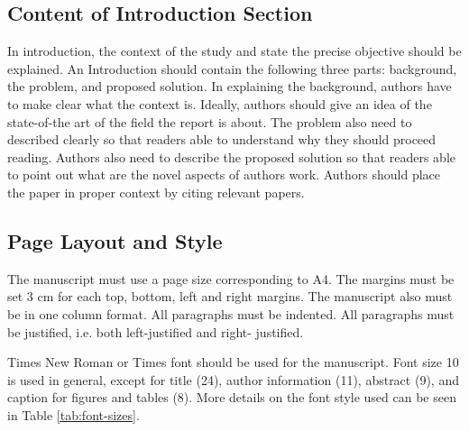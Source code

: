 \documentclass[]{indojc_single}
\begin{document}
\subsection{Content of Introduction Section}
In introduction, the context of the study and state the precise objective should be explained. An Introduction should contain the following three parts: background, the problem, and proposed solution. In explaining the background, authors have to make clear what the context is. Ideally, authors should give an idea of the state-of-the art of the field the report is about. The problem also need to described clearly so that readers able to understand why they should proceed reading. Authors also need to describe the proposed solution so that readers able to point out what are the novel aspects of authors work. Authors should place the paper in proper context by citing relevant papers. 

\subsection{Page Layout and Style}
The manuscript must use a page size corresponding to A4. The margins must be set 3 cm for each top, bottom, left and right margins. The manuscript also must be in one column format. All paragraphs must be indented. All paragraphs must be justified, i.e. both left-justified and right- justified.

Times New Roman or Times font should be used for the manuscript. Font size 10 is used in general, except for title (24), author information (11), abstract (9), and caption for figures and tables (8). More details on the font style used can be seen in Table \ref{tab:font-sizes}.
\end{document}
